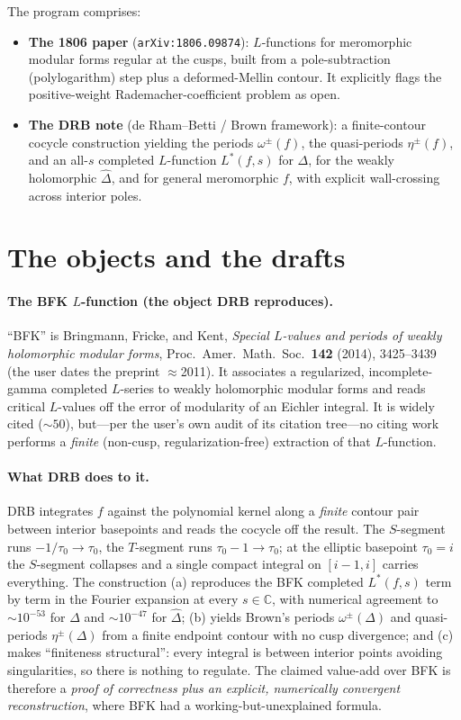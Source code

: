 \documentclass[11pt]{article}
\newcommand{\C}{\mathbb{C}}
\newcommand{\Lstar}{L^{*}}
\begin{document}
The program comprises:
\begin{itemize}[leftmargin=1.4em]
\item \textbf{The 1806 paper} (\texttt{arXiv:1806.09874}): $L$-functions for meromorphic
modular forms regular at the cusps, built from a pole-subtraction (polylogarithm)
step plus a deformed-Mellin contour. It explicitly flags the positive-weight
Rademacher-coefficient problem as open.
\item \textbf{The DRB note} (de Rham--Betti / Brown framework): a finite-contour cocycle
construction yielding the periods $\omega^{\pm}(f)$, the quasi-periods $\eta^{\pm}(f)$,
and an all-$s$ completed $L$-function $\Lstar(f,s)$ for $\Delta$, for the weakly
holomorphic $\widehat\Delta$, and for general meromorphic $f$, with explicit
wall-crossing across interior poles.
\end{itemize}

\section{The objects and the drafts}

\paragraph{The BFK $L$-function (the object DRB reproduces).}
``BFK'' is Bringmann, Fricke, and Kent, \emph{Special $L$-values and periods of weakly
holomorphic modular forms}, Proc.\ Amer.\ Math.\ Soc.\ \textbf{142} (2014), 3425--3439
(the user dates the preprint $\approx$2011). It associates a regularized,
incomplete-gamma completed $L$-series to weakly holomorphic modular forms and reads
critical $L$-values off the error of modularity of an Eichler integral. It is widely
cited ($\sim 50$), but---per the user's own audit of its citation tree---no citing work
performs a \emph{finite} (non-cusp, regularization-free) extraction of that $L$-function.

\paragraph{What DRB does to it.}
DRB integrates $f$ against the polynomial kernel along a \emph{finite} contour pair
between interior basepoints and reads the cocycle off the result. The $S$-segment runs
$-1/\tau_0 \to \tau_0$, the $T$-segment runs $\tau_0-1 \to \tau_0$; at the elliptic
basepoint $\tau_0=i$ the $S$-segment collapses and a single compact integral on
$[i-1,i]$ carries everything. The construction (a) reproduces the BFK completed
$\Lstar(f,s)$ term by term in the Fourier expansion at every $s\in\C$, with numerical
agreement to $\sim 10^{-53}$ for $\Delta$ and $\sim 10^{-47}$ for $\widehat\Delta$;
(b) yields Brown's periods $\omega^{\pm}(\Delta)$ and quasi-periods $\eta^{\pm}(\Delta)$
from a finite endpoint contour with no cusp divergence; and (c) makes ``finiteness
structural'': every integral is between interior points avoiding singularities, so
there is nothing to regulate. The claimed value-add over BFK is therefore a
\emph{proof of correctness plus an explicit, numerically convergent reconstruction},
where BFK had a working-but-unexplained formula.
\end{document}
